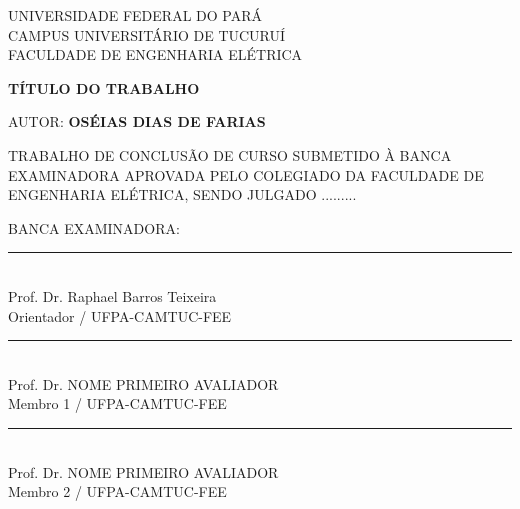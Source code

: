 
	\thispagestyle{empty}
	
	\begin{center}
			UNIVERSIDADE FEDERAL DO PARÁ\\
			CAMPUS UNIVERSITÁRIO DE TUCURUÍ\\
			FACULDADE DE ENGENHARIA ELÉTRICA
			
			\vspace{0.1cm}
			

			\textbf{TÍTULO DO TRABALHO}
			
			\vspace{-0.1cm}
			
			\begin{flushleft}
				AUTOR:\textbf{ OSÉIAS DIAS DE FARIAS}
			\end{flushleft}
			\vspace{-0.1cm}
	\end{center}

			\par\noindent \small{TRABALHO DE CONCLUSÃO DE CURSO SUBMETIDO  À BANCA EXAMINADORA APROVADA PELO COLEGIADO DA FACULDADE DE ENGENHARIA ELÉTRICA, SENDO JULGADO .........}
			


			\begin{center}
			\begin{flushleft}
			BANCA EXAMINADORA:	
			\end{flushleft}
		
			\vspace{0.45cm}
		
			\par\noindent\rule{0.7\textwidth}{0.2pt}\\ \vspace{-0.2cm}
			Prof. Dr. Raphael Barros Teixeira\\ \vspace{-0.2cm}
			{\small Orientador / UFPA-CAMTUC-FEE}
			\vspace{0.3cm}
			
			\par\noindent\rule{0.7\textwidth}{0.2pt}\\ \vspace{-0.2cm}
			Prof. Dr. NOME PRIMEIRO AVALIADOR\\ \vspace{-0.2cm}
			{\small Membro 1 / UFPA-CAMTUC-FEE}
			\vspace{0.3cm}

   		\par\noindent\rule{0.7\textwidth}{0.2pt}\\ \vspace{-0.2cm}
			Prof. Dr. NOME PRIMEIRO AVALIADOR\\ \vspace{-0.2cm}
			{\small Membro 2 / UFPA-CAMTUC-FEE}
			\vspace{0.3cm}

			
	\end{center}
